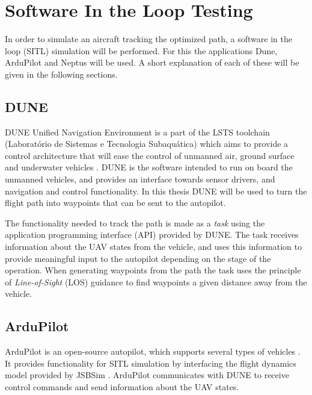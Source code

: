\section{Software In the Loop Testing}

In order to simulate an aircraft tracking the optimized path, a software in the loop (SITL) simulation will be performed. For this the applications Dune, ArduPilot and Neptus will be used. A short explanation of each of these will be given in the following sections.


\subsection{DUNE}

DUNE Unified Navigation Environment is a part of the LSTS toolchain (Laboratório de Sistemas e Tecnologia Subaquática) which aims to provide a control architecture that will ease the control of unmanned air, ground surface and underwater vehicles \cite{DUNE}. DUNE is the software intended to run on board the unmanned vehicles, and provides an interface towards sensor drivers, and navigation and control functionality. In this thesis DUNE will be used to turn the flight path into waypoints that can be sent to the autopilot.

The functionality needed to track the path is made as a \textit{task} using the application programming interface (API) provided by DUNE. The task receives information about the UAV states from the vehicle, and uses this information to provide meaningful input to the autopilot depending on the stage of the operation. When generating waypoints from the path the task uses the principle of \textit{Line-of-Sight} (LOS) guidance to find waypoints a given distance away from the vehicle.


\subsection{ArduPilot}

ArduPilot is an open-source autopilot, which supports several types of vehicles \cite{ARDUPILOT}. It provides functionality for SITL simulation by interfacing the flight dynamics model provided by JSBSim \cite{JSBSim}. ArduPilot communicates with DUNE to receive control commands and send information about the UAV states.


